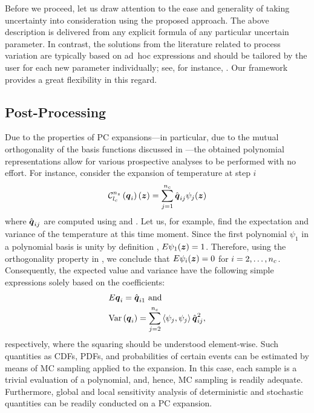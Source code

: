 Before we proceed, let us draw attention to the ease and generality of taking
uncertainty into consideration using the proposed approach. The above
description is delivered from any explicit formula of any particular uncertain
parameter. In contrast, the solutions from the literature related to process
variation are typically based on ad~hoc expressions and should be tailored by
the user for each new parameter individually; see, for instance,
\cite{ghanta2006, bhardwaj2008, huang2009a}. Our framework provides a great
flexibility in this regard.

\subsection{Post-Processing}

Due to the properties of \ac{PC} expansions---in particular, due to the mutual
orthogonality of the basis functions discussed in ---the
obtained polynomial representations allow for various prospective analyses to be
performed with no effort. For instance, consider the expansion of temperature at
step $i$
\[
  \chaos{\nz}{\lc}{\vq_i}(\vz) = \sum_{j = 1}^{\nc} \hat{\vq}_{ij} \psi_j(\vz)
\]
where $\hat{\boldsymbol{q}}_{ij}$ are computed using  and
. Let us, for example, find the expectation and
variance of the temperature at this time moment. Since the first polynomial
$\psi_1$ in a polynomial basis is unity by definition \cite{xiu2010},
$\expectation{\psi_1(\vz)} = 1$. Therefore, using the orthogonality property in
, we conclude that $\expectation{\psi_i(\vz)} =
0$ for $i = 2, \dots, {n_{c}}$. Consequently, the expected value and variance have
the following simple expressions solely based on the coefficients:
\[
  \begin{split}
    & \expectation{\vq_i} = \hat{\vq}_{i1} \text{ and} \\
    & \variance{\vq_i} = \sum_{j = 2}^{\nc} \innerproduct{\psi_j}{\psi_j} \hat{\vq}_{ij}^2,
  \end{split}
\]
respectively, where the squaring should be understood element-wise. Such
quantities as \acp{CDF}, \acp{PDF}, and probabilities of certain events can be
estimated by means of \ac{MC} sampling applied to the expansion. In this case,
each sample is a trivial evaluation of a polynomial, and, hence, \ac{MC}
sampling is readily adequate. Furthermore, global and local sensitivity analysis
of deterministic and stochastic quantities can be readily conducted on a \ac{PC}
expansion.


